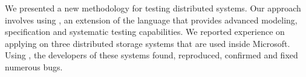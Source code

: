 We presented a new methodology for testing distributed systems. Our approach involves using \psharp, an extension of the \csharp language that provides advanced modeling, specification and systematic testing capabilities. We reported experience on applying \psharp on three distributed storage systems that are used inside Microsoft. Using \psharp, the developers of these systems found, reproduced, confirmed and fixed numerous bugs.